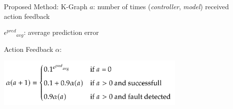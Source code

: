 \begin{frame}[fragile]{Proposed Method: K-Graph}
 $a$: number of times (\textit{controller}, \textit{model}) received action feedback\bs

 ${\epsilon^\mathit{pred}}_{avg}$: average prediction error\bs

  Action Feedback $\alpha$:\bs

  \includegraphics[width=0.7\textwidth]{figures/proposed_method/successfactor}
\end{frame}
